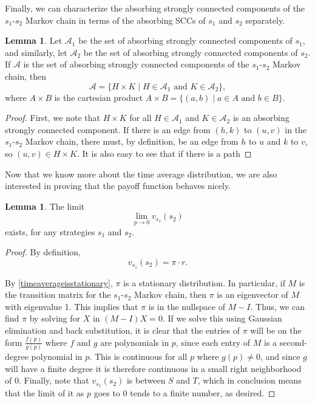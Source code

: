 \documentclass[11pt]{amsart}
\theoremstyle{definition}
\newtheorem{lemma}[theorem]{Lemma}
\theoremstyle{remark}
\begin{document}
Finally, we can characterize the absorbing strongly connected components of the $s_1$-$s_2$ Markov chain in terms of the absorbing SCCs of $s_1$ and $s_2$ separately.

\begin{lemma}
  \label{absorbingstronglyconnectedcomponentscartesianproduct}
  Let $\mathcal{A}_1$ be the set of absorbing strongly connected components of $s_1$, and similarly, let $\mathcal{A}_2$ be the set of absorbing strongly connected components of $s_2$. If $\mathcal{A}$ is the set of absorbing strongly connected components of the $s_1$-$s_2$ Markov chain, then 
  \begin{equation*}
    \mathcal{A} = \{H \times K \mid H \in \mathcal{A}_1 \text{ and } K \in \mathcal{A}_2\},
  \end{equation*}
  where $A \times B$ is the cartesian product $A \times B = \{(a, b) \mid a \in A \text{ and } b \in B\}$.
\end{lemma}

\begin{proof}
  First, we note that $H \times K$ for all $H \in \mathcal{A}_1$ and $K \in \mathcal{A}_2$ is an absorbing strongly connected component. If there is an edge from $(h,k)$ to $(u,v)$ in the $s_1$-$s_2$ Markov chain, there must, by definition, be an edge from $h$ to $u$ and $k$ to $v$, so $(u,v) \in H \times K$. It is also easy to see that if there is a path 
\end{proof}

Now that we know more about the time average distribution, we are also interested in proving that the payoff function behaves nicely.

\begin{lemma}
  \label{limitvexists}
  The limit \begin{equation*}
    \lim_{p \to 0} v_{s_1}(s_2)
  \end{equation*}
  exists, for any strategies $s_1$ and $s_2$.
\end{lemma}
\begin{proof}
  By definition, \begin{equation*}
    v_{s_1}(s_2) = \pi \cdot r.
  \end{equation*}

  By \cref{timeaverageisstationary}, $\pi$ is a stationary distribution. In particular, if $M$ is the transition matrix for the $s_1$-$s_2$ Markov chain, then $\pi$ is an eigenvector of $M$ with eigenvalue 1. This implies that $\pi$ is in the nullspace of $M - I$. Thus, we can find $\pi$ by solving for $X$ in $(M - I)X = 0$. If we solve this using Gaussian elimination and back substitution, it is clear that the entries of $\pi$ will be on the form $\frac{f(p)}{g(p)}$ where $f$ and $g$ are polynomials in $p$, since each 
  entry of $M$ is a second-degree polynomial in $p$. This is continuous for all $p$ where $g(p) \neq 0$, and since $g$ will have a finite degree it is therefore continuous in a small right neighborhood of 0. Finally, note that $v_{s_1}(s_2)$ is between $S$ and $T$, which in conclusion means that the limit of it as $p$ goes to 0 tends to a finite number, as desired.
\end{proof}
\end{document}
